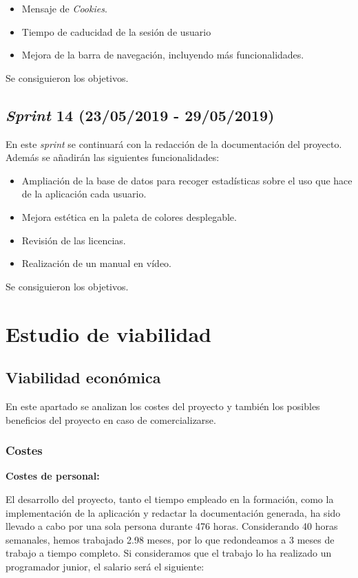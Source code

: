 \begin{itemize}
\item Mensaje de \emph{Cookies}.

\item Tiempo de caducidad de la sesión de usuario

\item Mejora de la barra de navegación, incluyendo más funcionalidades.
\end{itemize}
Se consiguieron los objetivos.

\subsection{\emph{Sprint} 14 (23/05/2019 - 29/05/2019)}

En este \emph{sprint} se continuará con la redacción de la documentación del proyecto. Además se añadirán las siguientes funcionalidades:

\begin{itemize}
\item Ampliación de la base de datos para recoger estadísticas sobre el uso que hace de la aplicación cada usuario.

\item Mejora estética en la paleta de colores desplegable.

\item Revisión de las licencias.

\item Realización de un manual en vídeo.
\end{itemize}
Se consiguieron los objetivos.

\section{Estudio de viabilidad}

\subsection{Viabilidad económica}

En este apartado se analizan los costes del proyecto y también los posibles  beneficios del proyecto en caso de comercializarse.

\subsubsection{Costes}
\textbf{Costes de personal:}

El desarrollo del proyecto, tanto el tiempo empleado en la formación, como la implementación de la aplicación y redactar la documentación
generada, ha sido llevado a cabo por una sola persona durante 476 horas. Considerando 40 horas semanales, hemos trabajado 2.98  meses, por lo que redondeamos a 3 meses de trabajo a tiempo completo. Si consideramos que el trabajo lo ha realizado un programador junior, el salario será el siguiente:

